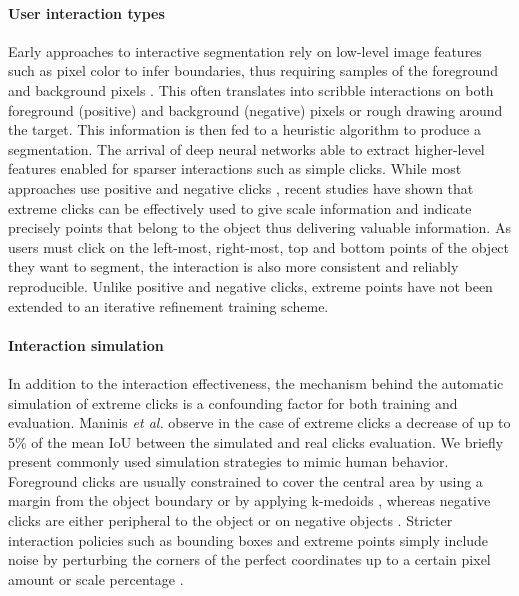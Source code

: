 \documentclass[letterpaper, 10 pt, conference]{ieeeconf}
\begin{document}
\paragraph{User interaction types} Early approaches to interactive segmentation rely on low-level image features such as pixel color to infer boundaries, thus requiring samples of the foreground and background pixels \cite{greig89, mortensen95}. This often translates into scribble interactions on both foreground (positive) and background (negative) pixels or rough drawing around the target. This information is then fed to a heuristic algorithm to produce a segmentation. The arrival of deep neural networks able to extract higher-level features enabled for sparser interactions such as simple clicks. While most approaches use positive and negative clicks \cite{xu16, li18, mahadevan18, majumder19}, recent studies have shown that extreme clicks \cite{papadopoulos17,maninis18} can be effectively used to give scale information and indicate precisely points that belong to the object thus delivering valuable information. As users must click on the left-most, right-most, top and bottom points of the object they want to segment, the interaction is also more consistent and reliably reproducible. Unlike positive and negative clicks, extreme points have not been extended to an iterative refinement training scheme.

\paragraph{Interaction simulation} In addition to the interaction effectiveness, the mechanism behind the automatic simulation of extreme clicks is a confounding factor for both training and evaluation. Maninis \textit{et al.} \cite{maninis18} observe in the case of extreme clicks a decrease of up to 5\% of the mean IoU between the simulated and real clicks evaluation. We briefly present commonly used simulation strategies to mimic human behavior. Foreground clicks are usually constrained to cover the central area by using a margin from the object boundary or by applying k-medoids \cite{jang19}, whereas negative clicks are either peripheral to the object or on negative objects \cite{xu16, liew17, benard18, li18, liew19, majumder19}.  Stricter interaction policies such as bounding boxes and extreme points simply include noise by perturbing the corners of the perfect coordinates up to a certain pixel amount \cite{maninis18, benenson19, shahin20} or scale percentage \cite{wang19}.
\end{document}
